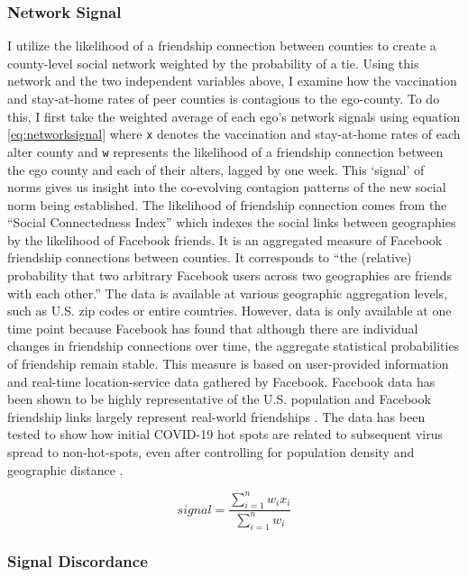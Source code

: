 \hypertarget{network-signal}{%
\subsubsection{Network Signal}\label{network-signal}}

I utilize the likelihood of a friendship connection between counties to create a
county-level social network weighted by the probability of a tie. Using this
network and the two independent variables above, I examine how the vaccination
and stay-at-home rates of peer counties is contagious to the ego-county. To do
this, I first take the weighted average of each ego's network signals using
equation \eqref{eq:networksignal} where \texttt{x} denotes the vaccination and
stay-at-home rates of each alter county and \texttt{w} represents the likelihood
of a friendship connection between the ego county and each of their alters,
lagged by one week. This `signal' of norms gives us insight into the co-evolving
contagion patterns of the new social norm being established. The likelihood of
friendship connection comes from the ``Social Connectedness Index''
\citep{Bailey2018, facebook20} which indexes the social links between
geographies by the likelihood of Facebook friends. It is an aggregated measure
of Facebook friendship connections between counties. It corresponds to ``the
(relative) probability that two arbitrary Facebook users across two geographies
are friends with each other.'' The data is available at various geographic
aggregation levels, such as U.S. zip codes or entire countries. However, data is
only available at one time point because Facebook has found that although there
are individual changes in friendship connections over time, the aggregate
statistical probabilities of friendship remain stable. This measure is based on
user-provided information and real-time location-service data gathered by
Facebook. Facebook data has been shown to be highly representative of the U.S.
population and Facebook friendship links largely represent real-world
friendships \citep{bailey_etal18, jones_etal13}. The data has been tested to
show how initial COVID-19 hot spots are related to subsequent virus spread to
non-hot-spots, even after controlling for population density and geographic
distance \citep{Kuchler2020}.

\begin{equation}
signal = \frac{\sum_{i=1}^nw_ix_i}{\sum^n_{i=1}w_i} \label{eq:networksignal}
\end{equation}

\hypertarget{signal-discordance}{%
\subsubsection{Signal Discordance}\label{signal-discordance}}

